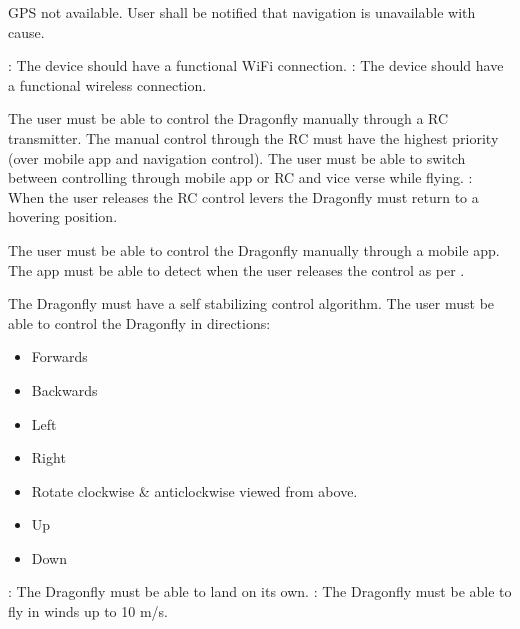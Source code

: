 \documentclass[a4paper]{article}
\begin{document}
 GPS not available.
 User shall be notified that navigation is unavailable with cause.


: The device should have a functional WiFi connection.
: The device should have a functional wireless connection.


 The user must be able to control the Dragonfly manually through a RC transmitter.
 The manual control through the RC must have the highest priority (over mobile app and navigation control).
 The user must be able to switch between controlling through mobile app or RC and vice verse while flying.
: When the user releases the RC control levers the Dragonfly must return to a hovering position.

 The user must be able to control the Dragonfly manually through a mobile app.
 The app must be able to detect when the user releases the control as per .

 The Dragonfly must have a self stabilizing control algorithm.
 The user must be able to control the Dragonfly in directions:
\begin{itemize}
\item Forwards
\item Backwards
\item Left
\item Right
\item Rotate clockwise \& anticlockwise viewed from above.
\item Up
\item Down
\end{itemize}
: The Dragonfly must be able to land on its own.
: The Dragonfly must be able to fly in winds up to 10 m/s. %
\end{document}
